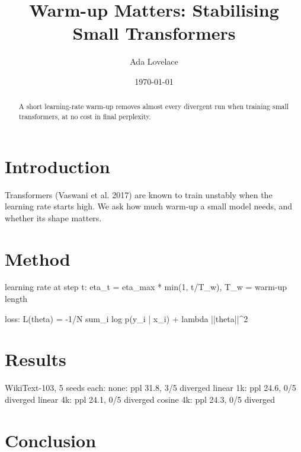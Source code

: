 \documentclass[11pt]{article}
\title{Warm-up Matters: Stabilising Small Transformers}
\author{Ada Lovelace}
\date{\today}
\begin{document}
\maketitle

\begin{abstract}
A short learning-rate warm-up removes almost every divergent run when training small transformers, at no cost in final perplexity.
\end{abstract}

\section{Introduction}

Transformers (Vaswani et al. 2017) are known to train unstably when the learning rate starts high.
We ask how much warm-up a small model needs, and whether its shape matters.

\section{Method}

learning rate at step t: eta_t = eta_max * min(1, t/T_w), T_w = warm-up length

loss: L(theta) = -1/N sum_i log p(y_i | x_i) + lambda ||theta||^2

\section{Results}

WikiText-103, 5 seeds each:
none: ppl 31.8, 3/5 diverged
linear 1k: ppl 24.6, 0/5 diverged
linear 4k: ppl 24.1, 0/5 diverged
cosine 4k: ppl 24.3, 0/5 diverged

\section{Conclusion}
\end{document}
